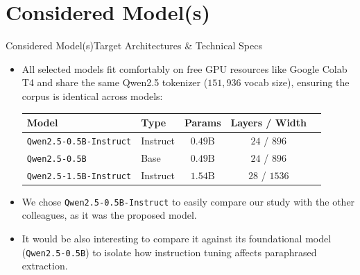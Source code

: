 \documentclass[10pt,aspectratio=43
	]{beamer}
\begin{document}
\section{Considered Model(s)}

	\begin{frame}{Considered Model(s)}{Target Architectures \& Technical Specs}
        \begin{itemize}
		    \item All selected models fit comfortably on free GPU resources like Google Colab T4 and share the same Qwen2.5 tokenizer ($151{,}936$ vocab size), ensuring the corpus is identical across models:
            \vspace{0.15cm}
            \begin{table}
                \centering
                \scriptsize
                \begin{tabular}{llccc}
                    \toprule
                    \textbf{Model} & \textbf{Type} & \textbf{Params} & \textbf{Layers / Width} \\ %
                    \midrule
                    \texttt{Qwen2.5-0.5B-Instruct} & Instruct & $0.49\text{B}$ & $24$ / $896$  \\ %
                    \texttt{Qwen2.5-0.5B}          & Base     & $0.49\text{B}$ & $24$ / $896$  \\ %
                    \texttt{Qwen2.5-1.5B-Instruct} & Instruct & $1.54\text{B}$ & $28$ / $1536$ \\ %
                    \bottomrule
                \end{tabular}
            \end{table}
            \vspace{0.05cm}

            \item We chose \texttt{Qwen2.5-0.5B-Instruct} to easily compare our study with the other colleagues, as it was the proposed model.
            \item It would be also interesting to compare it against its foundational model (\texttt{Qwen2.5-0.5B}) to isolate how instruction tuning affects paraphrased extraction.
        \end{itemize}
    \end{frame}
\end{document}
